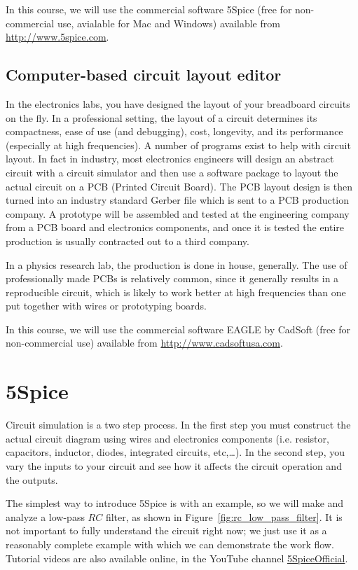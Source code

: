 \documentclass{article}
\begin{document}
In this course, we will use the commercial software 5Spice (free for non-commercial use, avialable for Mac and Windows) available from \url{http://www.5spice.com}.

\subsection{Computer-based circuit layout editor}
In the electronics labs, you have designed the layout of your breadboard circuits on the fly. In a professional setting, the layout of a circuit determines its compactness, ease of use (and debugging), cost, longevity, and its performance (especially at high frequencies). A number of programs exist to help with circuit layout. In fact in industry, most electronics engineers will design an abstract circuit with a circuit simulator and then use a software package to layout the actual circuit on a PCB (Printed Circuit Board). The PCB layout design is then turned into an industry standard Gerber file which is sent to a PCB production company. A prototype will be assembled and tested at the engineering company from a PCB board and electronics components, and once it is tested the entire production is usually contracted out to a third company.

In a physics research lab, the production is done in house, generally. The use of professionally made PCBs is relatively common, since it generally results in a reproducible circuit, which is likely to work better at high frequencies than one put together with wires or prototyping boards.

In this course, we will use the commercial software EAGLE by CadSoft (free for non-commercial use) available from \url{http://www.cadsoftusa.com}.

\section{5Spice}
Circuit simulation is a two step process. In the first step you must construct the actual circuit diagram using wires and electronics components (i.e. resistor, capacitors, inductor, diodes, integrated circuits, etc,\ldots). In the second step, you vary the inputs to your circuit and see how it affects the circuit operation and the outputs.

The simplest way to introduce 5Spice is with an example, so we will make and analyze a low-pass $RC$ filter, as shown in Figure~\ref{fig:rc_low_pass_filter}.  It is not important to fully understand the circuit right now; we just use it as a reasonably complete example with which we can demonstrate the work flow.  Tutorial videos are also available online, in the YouTube channel \href{https://www.youtube.com/channel/UCC1qbSb4QSiS_0mZziTIxTA}{5SpiceOfficial}.
\end{document}
